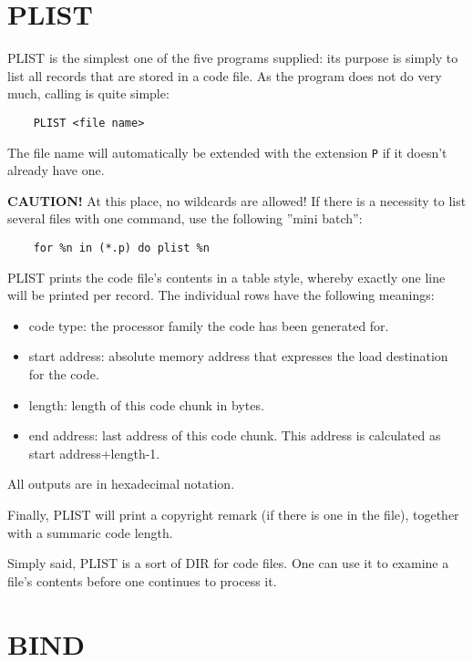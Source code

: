 \documentclass[12pt,twoside]{report}
\newcommand{\bb}[1]{{\bf #1}}
\newcommand{\tty}[1]{{\tt #1}}
\begin{document}

\section{PLIST}

PLIST is the simplest one of the five programs supplied: its purpose
is simply to list all records that are stored in a code file.  As the
program does not do very much, calling is quite simple:
\begin{verbatim}
    PLIST <file name>
\end{verbatim}
The file name will automatically be extended with the extension \tty{P} if
it doesn't already have one.

\bb{CAUTION!} At this place, no wildcards are allowed!  If there is a
necessity to list several files with one command, use the following
''mini batch'': 
\begin{verbatim}
    for %n in (*.p) do plist %n
\end{verbatim}
PLIST prints the code file's contents in a table style, whereby
exactly one line will be printed per record.  The individual rows
have the following meanings:
\begin{itemize}
\item{code type: the processor family the code has been generated for.}
\item{start address: absolute memory address that expresses the load
      destination for the code.}
\item{length: length of this code chunk in bytes.}
\item{end address: last address of this code chunk.  This address 
      is calculated as start address+length-1.}
\end{itemize}
All outputs are in hexadecimal notation.

Finally, PLIST will print a copyright remark (if there is one in the
file), together with a summaric code length.

Simply said, PLIST is a sort of DIR for code files.  One can use it
to examine a file's contents before one continues to process it.


\section{BIND}
\end{document}
